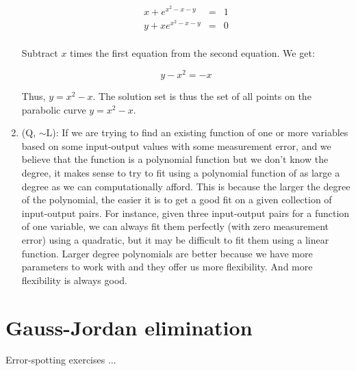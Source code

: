 \documentclass[10pt]{amsart}
\begin{document}
\begin{enumerate}
  \begin{eqnarray*}
    x + e^{x^2 - x - y} & = & 1 \\
    y + xe^{x^2 - x - y} & = & 0 \\
  \end{eqnarray*}

  Subtract $x$ times the first equation from the second equation. We get:

  $$y - x^2 = - x$$

  Thus, $y = x^2 - x$. The solution set is thus the set of all points
  on the parabolic curve $y = x^2 - x$.
\item (Q, $\sim$L): If we are trying to find an existing function of
  one or more variables based on some input-output values with some
  measurement error, and we believe that the function is a polynomial
  function but we don't know the degree, it makes sense to try to fit
  using a polynomial function of as large a degree as we can
  computationally afford. This is because the larger the degree of the
  polynomial, the easier it is to get a good fit on a given collection
  of input-output pairs. For instance, given three input-output pairs
  for a function of one variable, we can always fit them perfectly
  (with zero measurement error) using a quadratic, but it may be
  difficult to fit them using a linear function. Larger degree
  polynomials are better because we have more parameters to work with
  and they offer us more flexibility. And more flexibility is always
  good.
\end{enumerate}

\section{Gauss-Jordan elimination}

Error-spotting exercises ...
\end{document}
